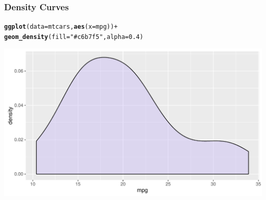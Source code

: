 \documentclass[12pt]{beamer}\usepackage[]{graphicx}\usepackage[]{color}
\makeatletter
\newcommand{\hlnum}[1]{\textcolor[rgb]{0.686,0.059,0.569}{#1}}%
\newcommand{\hlstr}[1]{\textcolor[rgb]{0.192,0.494,0.8}{#1}}%
\newcommand{\hlopt}[1]{\textcolor[rgb]{0,0,0}{#1}}%
\newcommand{\hlstd}[1]{\textcolor[rgb]{0.345,0.345,0.345}{#1}}%
\newcommand{\hlkwc}[1]{\textcolor[rgb]{0.333,0.667,0.333}{#1}}%
\newcommand{\hlkwd}[1]{\textcolor[rgb]{0.737,0.353,0.396}{\textbf{#1}}}%
\newenvironment{kframe}{%
 \def\at@end@of@kframe{}%
 \ifinner\ifhmode%
  \def\at@end@of@kframe{\end{minipage}}%
  \begin{minipage}{\columnwidth}%
 \fi\fi%
 \def\FrameCommand##1{\hskip\@totalleftmargin \hskip-\fboxsep
 \colorbox{shadecolor}{##1}\hskip-\fboxsep
     \hskip-\linewidth \hskip-\@totalleftmargin \hskip\columnwidth}%
 \MakeFramed {\advance\hsize-\width
   \@totalleftmargin\z@ \linewidth\hsize
   \@setminipage}}%
 {\par\unskip\endMakeFramed%
 \at@end@of@kframe}
\newenvironment{knitrout}{}{} %
\makeatother
\begin{document}
\begin{frame}[fragile]
\frametitle{Density Curves}

\begin{knitrout}\scriptsize
{}\color{fgcolor}\begin{kframe}
\begin{alltt}
\hlkwd{ggplot}\hlstd{(}\hlkwc{data} \hlstd{= mtcars,} \hlkwd{aes}\hlstd{(}\hlkwc{x} \hlstd{= mpg))} \hlopt{+}
  \hlkwd{geom_density}\hlstd{(}\hlkwc{fill} \hlstd{=} \hlstr{"#c6b7f5"}\hlstd{,} \hlkwc{alpha} \hlstd{=} \hlnum{0.4}\hlstd{)}
\end{alltt}
\end{kframe}

{\centering \includegraphics[width=.9\linewidth,height=.5\linewidth]{figure/unnamed-chunk-22-1} 

}



\end{knitrout}

\end{frame}

\end{document}
